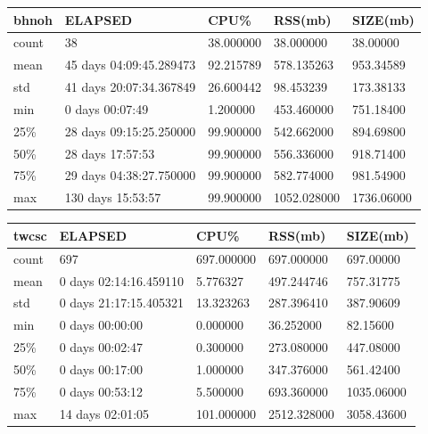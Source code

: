\documentclass{article}
\begin{document}
\begin{tabular}{|l|l|l|l|l|}
\hline 
\hline bhnoh&    ELAPSED&   CPU\%&  RSS(mb)&   SIZE(mb) \\
\hline count&    38& 38.000000&  38.000000&  38.00000 \\
\hline mean&  45 days 04:09:45.289473& 92.215789&  578.135263&  953.34589 \\
\hline std&  41 days 20:07:34.367849& 26.600442&  98.453239&  173.38133 \\
\hline min&   0 days 00:07:49&  1.200000&  453.460000&  751.18400 \\
\hline 25\%&  28 days 09:15:25.250000& 99.900000&  542.662000&  894.69800 \\
\hline 50\%&   28 days 17:57:53& 99.900000&  556.336000&  918.71400 \\
\hline 75\%&  29 days 04:38:27.750000& 99.900000&  582.774000&  981.54900 \\
\hline max&  130 days 15:53:57& 99.900000& 1052.028000& 1736.06000 \\
\hline 
\end{tabular}
 
\begin{tabular}{|l|l|l|l|l|}
\hline 
\hline twcsc& ELAPSED&   CPU\%&  RSS(mb)&   SIZE(mb) \\
\hline count&    697& 697.000000&  697.000000&  697.00000 \\
\hline mean&  0 days 02:14:16.459110&  5.776327&  497.244746&  757.31775 \\
\hline std&  0 days 21:17:15.405321&  13.323263&  287.396410&  387.90609 \\
\hline min&   0 days 00:00:00&  0.000000&  36.252000&  82.15600 \\
\hline 25\%&   0 days 00:02:47&  0.300000&  273.080000&  447.08000 \\
\hline 50\%&   0 days 00:17:00&  1.000000&  347.376000&  561.42400 \\
\hline 75\%&   0 days 00:53:12&  5.500000&  693.360000& 1035.06000 \\
\hline max&  14 days 02:01:05& 101.000000& 2512.328000& 3058.43600 \\
\hline 
\end{tabular}
 
\end{document}
